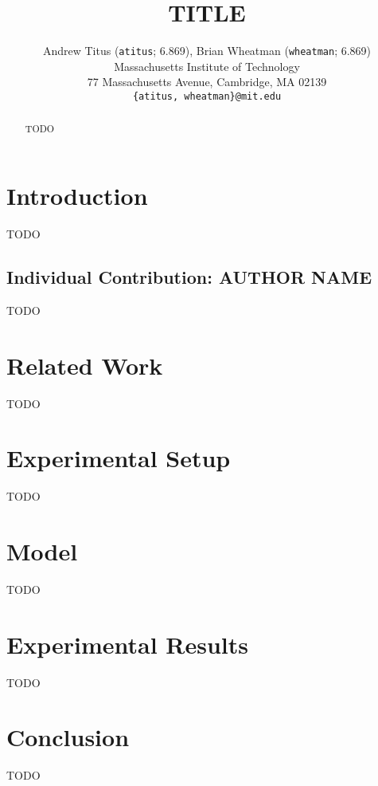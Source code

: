 \documentclass[10pt,twocolumn,letterpaper]{article}
\begin{document}
\title{TITLE}

\author{Andrew Titus (\texttt{atitus}; 6.869), Brian Wheatman (\texttt{wheatman}; 6.869)\\
Massachusetts Institute of Technology\\
77 Massachusetts Avenue, Cambridge, MA 02139\\
{\tt\small \{atitus, wheatman\}@mit.edu}
}

\maketitle

\begin{abstract}
TODO
\end{abstract}

\section{Introduction}
\label{introduction}
TODO

\subsection{Individual Contribution: AUTHOR NAME}
\label{individual_contribution}
TODO

\cite{AlexNet}



\section{Related Work}
\label{related_work}
TODO



\section{Experimental Setup}
\label{exp_setup}
TODO



\section{Model}
\label{model}
TODO



\section{Experimental Results}
\label{exp_results}
TODO



\section{Conclusion}
\label{conclusion}
TODO



{\small


}
\end{document}
